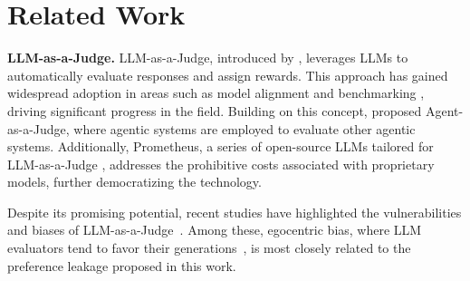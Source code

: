 \documentclass{article} %
\begin{document}
\section{Related Work}


\textbf{LLM-as-a-Judge.} LLM-as-a-Judge, introduced by \citet{zheng2023judging}, leverages LLMs to automatically evaluate responses and assign rewards. This approach has gained widespread adoption in areas such as model alignment \cite{zhang-etal-2024-self} and benchmarking \cite{liu2023alignbench,zhang2024balancing,gao2023human,zhong2024law,beigi2024can,li2026toolprmbench}, driving significant progress in the field. Building on this concept, \citet{zhuge2024agent} proposed Agent-as-a-Judge, where agentic systems are employed to evaluate other agentic systems. Additionally, Prometheus, a series of open-source LLMs tailored for LLM-as-a-Judge \cite{kim2023prometheus, kim2024prometheus}, addresses the prohibitive costs associated with proprietary models, further democratizing the technology.


Despite its promising potential, recent studies have highlighted the vulnerabilities and biases of LLM-as-a-Judge~\cite{zheng2023judging,ye2024justice, koo2023benchmarking, chen2024humans, zheng2023judging, huang2024position,thakur2024judging,10.1145/3658644.3690291}. Among these, egocentric bias, where LLM evaluators tend to favor their generations~\cite{koo2024benchmarking, liu2024llms, wataoka2024self, xu2024pride, rando2025adversarial, panickssery2024llm, chen2025llm}, is most closely related to the preference leakage proposed in this work. 
\end{document}
